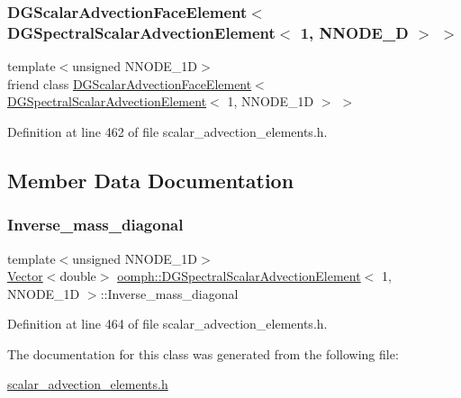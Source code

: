 \subsubsection{\texorpdfstring{D\+G\+Scalar\+Advection\+Face\+Element$<$ D\+G\+Spectral\+Scalar\+Advection\+Element$<$ 1, N\+N\+O\+D\+E\+\_\+D $>$ $>$}{DGScalarAdvectionFaceElement< DGSpectralScalarAdvectionElement< 1, NNODE\_1D > >}}
{\footnotesize\ttfamily template$<$unsigned N\+N\+O\+D\+E\+\_\+1D$>$ \\
friend class \hyperlink{classoomph_1_1DGScalarAdvectionFaceElement}{D\+G\+Scalar\+Advection\+Face\+Element}$<$ \hyperlink{classoomph_1_1DGSpectralScalarAdvectionElement}{D\+G\+Spectral\+Scalar\+Advection\+Element}$<$ 1, N\+N\+O\+D\+E\+\_\+1D $>$ $>$\hspace{0.3cm}{\ttfamily [friend]}}



Definition at line 462 of file scalar\+\_\+advection\+\_\+elements.\+h.



\subsection{Member Data Documentation}
\mbox{\label{classoomph_1_1DGSpectralScalarAdvectionElement_3_011_00_01NNODE__1D_01_4_a330e72eb72656497739be617dac1986b}} 
\subsubsection{\texorpdfstring{Inverse\+\_\+mass\+\_\+diagonal}{Inverse\_mass\_diagonal}}
{\footnotesize\ttfamily template$<$unsigned N\+N\+O\+D\+E\+\_\+1D$>$ \\
\hyperlink{classoomph_1_1Vector}{Vector}$<$double$>$ \hyperlink{classoomph_1_1DGSpectralScalarAdvectionElement}{oomph\+::\+D\+G\+Spectral\+Scalar\+Advection\+Element}$<$ 1, N\+N\+O\+D\+E\+\_\+1D $>$\+::Inverse\+\_\+mass\+\_\+diagonal\hspace{0.3cm}{\ttfamily [private]}}



Definition at line 464 of file scalar\+\_\+advection\+\_\+elements.\+h.



The documentation for this class was generated from the following file\+:\begin{DoxyCompactItemize}
\item 
\hyperlink{scalar__advection__elements_8h}{scalar\+\_\+advection\+\_\+elements.\+h}\end{DoxyCompactItemize}
